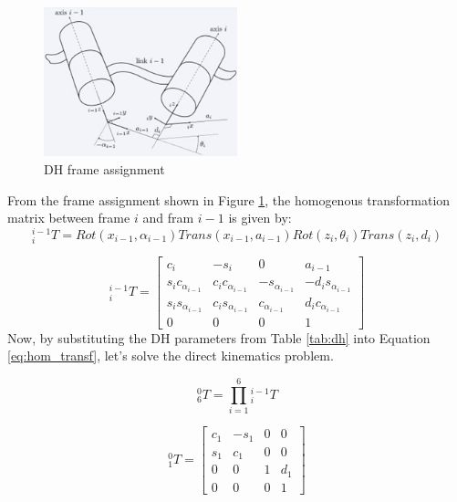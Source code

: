 \begin{figure}[H]
    \centering
    \includegraphics[width=0.5\textwidth]{images/dh_frame}
    \caption{DH frame assignment}
    \label{fig:dh_frame}
\end{figure}

From the frame assignment shown in Figure \ref{fig:dh_frame},
the homogenous transformation matrix between frame $i$ and fram $i-1$ is given by:
\begin{equation} \label{eq:transf}
    {_i^{i-1}}T=Rot(x_{i-1},\alpha_{i-1})Trans(x_{i-1},a_{i-1})Rot(z_i,\theta_i)Trans(z_i,d_i)
\end{equation}

\begin{equation} \label{eq:hom_transf}
    {_i^{i-1}}T=\begin{bmatrix}
        c_i                  & -s_i                 & 0                 & a_{i-1}              \\
        s_i c_{\alpha_{i-1}} & c_i c_{\alpha_{i-1}} & -s_{\alpha_{i-1}} & -d_is_{\alpha_{i-1}} \\
        s_i s_{\alpha_{i-1}} & c_i s_{\alpha_{i-1}} & c_{\alpha_{i-1}}  & d_ic_{\alpha_{i-1}}  \\
        0                    & 0                    & 0                 & 1
    \end{bmatrix}
\end{equation}
Now, by substituting the DH parameters from Table \ref{tab:dh} into Equation \ref{eq:hom_transf},
let's solve the direct kinematics problem.

\begin{equation} \label{eq:hom_transf_prod}
    {_6^{0}}T=\prod_{i=1}^{6}{_i^{i-1}}T
\end{equation}

\begin{equation} \label{eq:T10}
    {_1^{0}}T=\begin{bmatrix}
        c_1 & -s_1 & 0 & 0   \\
        s_1 & c_1  & 0 & 0   \\
        0   & 0    & 1 & d_1 \\
        0   & 0    & 0 & 1
    \end{bmatrix}
\end{equation}


